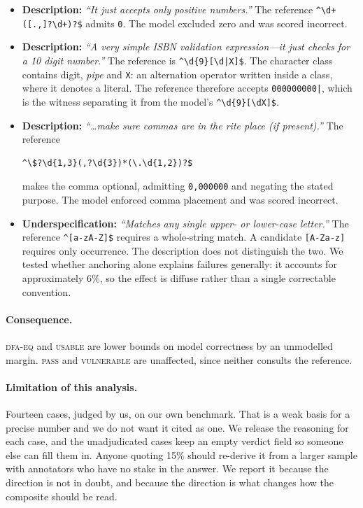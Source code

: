 \documentclass[11pt]{article}
\newcommand{\pass}{\textsc{pass}}
\newcommand{\usable}{\textsc{usable}}
\newcommand{\vuln}{\textsc{vulnerable}}
\newcommand{\dfaeq}{\textsc{dfa-eq}}
\begin{document}
\begin{itemize}
\item \textbf{Description:} \emph{``It just accepts only positive numbers.''}
The reference \lstinline!^\d+([.,]?\d+)?$! admits \texttt{0}. The model
excluded zero and was scored incorrect.

\item \textbf{Description:} \emph{``A very simple ISBN validation
expression---it just checks for a 10 digit number.''} The reference is
\lstinline!^\d{9}[\d|X]$!. The character class contains digit, \emph{pipe}
and \texttt{X}: an alternation operator written inside a class, where it
denotes a literal. The reference therefore accepts \texttt{000000000|}, which
is the witness separating it from the model's \lstinline!^\d{9}[\dX]$!.

\item \textbf{Description:} \emph{``\ldots make sure commas are in the rite
place (if present).''} The reference
\begin{lstlisting}
^\$?\d{1,3}(,?\d{3})*(\.\d{1,2})?$
\end{lstlisting}
makes the comma optional, admitting \texttt{0,000000} and negating the stated
purpose. The model enforced comma placement and was scored incorrect.

\item \textbf{Underspecification:} \emph{``Matches any single upper- or
lower-case letter.''} The reference \lstinline!^[a-zA-Z]$! requires a
whole-string match. A candidate \lstinline![A-Za-z]! requires only
occurrence. The description does not distinguish the two. We tested whether
anchoring alone
explains failures generally: it accounts for approximately 6\%, so the effect
is diffuse rather than a single correctable convention.
\end{itemize}

\paragraph{Consequence.} \dfaeq{} and \usable{} are lower bounds on model
correctness by an unmodelled margin. \pass{} and \vuln{} are unaffected,
since neither consults the reference.

\paragraph{Limitation of this analysis.} Fourteen cases, judged by us, on our
own benchmark. That is a weak basis for a precise number and we do not want it
cited as one. We release the reasoning for each case, and the unadjudicated
cases keep an empty verdict field so someone else can fill them in. Anyone
quoting 15\% should re-derive it from a larger sample with annotators who have
no stake in the answer. We report it because the direction is not in doubt,
and because the direction is what changes how the composite should be read.
\end{document}
